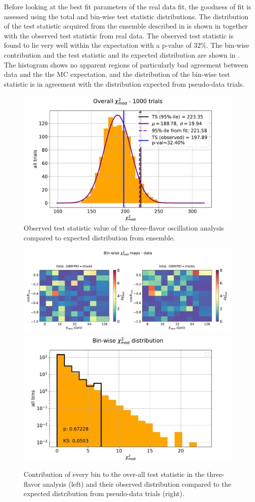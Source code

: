 Before looking at the best fit parameters of the real data fit, the goodness of fit is assessed using the total and bin-wise test statistic distributions. The distribution of the test statistic acquired from the ensemble described in  is shown in  together with the observed test statistic from real data. The observed test statistic is found to lie very well within the expectation with a p-value of 32\%. The bin-wise contribution and the test statistic and its expected distribution are shown in . The histogram shows no apparent regions of particularly bad agreement between data and the the MC expectation, and the distribution of the bin-wise test statistic is in agreement with the distribution expected from pseudo-data trials.

\begin{figure}
    \centering
    \includegraphics[width=0.8\linewidth]{figures/measurement/three_flavor/ensemble_pre_fit/overall_ts_wings_trials.pdf}
    \caption{Observed test statistic value of the three-flavor oscillation analysis compared to expected distribution from ensemble.}
    \label{fig:three-flavor-ts-ensemble}
\end{figure}

\begin{figure}
    \centering
    \includegraphics[height=0.22\linewidth,trim={0 0 0 1.5cm},clip]{figures/measurement/three_flavor/ensemble_pre_fit/real_fit_binwise_pulls_pre_bugfix.pdf}
    \includegraphics[height=0.22\linewidth]{figures/measurement/three_flavor/ensemble_pre_fit/binwise_ts_wings_trials.pdf}
    \caption{Contribution of every bin to the over-all test statistic in the three-flavor analysis (left) and their observed distribution compared to the expected distribution from pseudo-data trials (right).}
    \label{fig:three-flavor-binwise-ts}
\end{figure}

